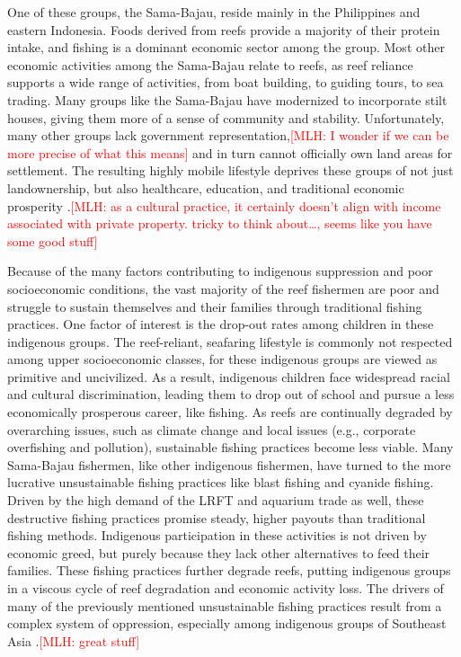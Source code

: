 \documentclass{book}\usepackage{knitr}
\newcommand{\red}[1]{\textcolor{red}{[MLH: #1]}}
\begin{document}
{One of these groups, the Sama-Bajau, reside mainly in the Philippines and eastern Indonesia. Foods derived from reefs provide a majority of their protein intake, and fishing is a dominant economic sector among the group. Most other economic activities among the Sama-Bajau relate to reefs, as reef reliance supports a wide range of activities, from boat building, to guiding tours, to sea trading. Many groups like the Sama-Bajau have modernized to incorporate stilt houses, giving them more of a sense of community and stability. Unfortunately, many other groups lack government representation,\red{I wonder if we can be more precise of what this means} and in turn cannot officially own land areas for settlement. The resulting highly mobile lifestyle deprives these groups of not just landownership, but also healthcare, education, and traditional economic prosperity \citep{boatpeople}.\red{as a cultural practice, it certainly doesn't align with income associated with private property. tricky to think about\ldots, seems like you have some good stuff}

Because of the many factors contributing to indigenous suppression and poor socioeconomic conditions, the vast majority of the reef fishermen are poor and struggle to sustain themselves and their families through traditional fishing practices. One factor of interest is the drop-out rates among children in these indigenous groups. The reef-reliant, seafaring lifestyle is commonly not respected among upper socioeconomic classes, for these indigenous groups are viewed as primitive and uncivilized. As a result, indigenous children face widespread racial and cultural discrimination, leading them to drop out of school and pursue a less economically prosperous career, like fishing. As reefs are continually degraded by overarching issues, such as climate change and local issues (e.g., corporate overfishing and pollution), sustainable fishing practices become less viable. Many Sama-Bajau fishermen, like other indigenous fishermen, have turned to the more lucrative unsustainable fishing practices like blast fishing and cyanide fishing. Driven by the high demand of the LRFT and aquarium trade as well, these destructive fishing practices promise steady, higher payouts than traditional fishing methods. Indigenous participation in these activities is not driven by economic greed, but purely because they lack other alternatives to feed their families. These fishing practices further degrade reefs, putting indigenous groups in a viscous cycle of reef degradation and economic activity loss. The drivers of many of the previously mentioned unsustainable fishing practices result from a complex system of oppression, especially among indigenous groups of Southeast Asia \citep{boatpeople}.\red{great stuff}

}
\end{document}

